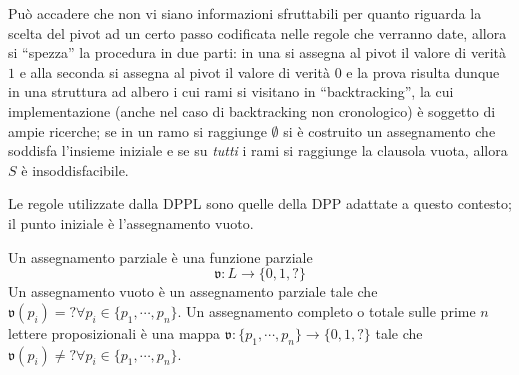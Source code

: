 Può accadere che non vi siano informazioni sfruttabili per quanto riguarda 
la scelta del pivot ad un certo passo codificata nelle regole che verranno 
date, allora si ``spezza'' la procedura in due parti: in una si assegna al pivot 
il valore di verità $1$ e alla seconda si assegna al pivot il valore di verità 
$0$ e la prova risulta dunque in una 
struttura ad albero i cui rami si visitano in ``backtracking'', la cui implementazione
(anche nel caso di backtracking non cronologico) è soggetto di ampie ricerche; 
se in un ramo si raggiunge $\emptyset$ si è costruito un assegnamento che soddisfa 
l'insieme iniziale e se su \textit{tutti} i rami si raggiunge la clausola 
vuota, allora $S$ è insoddisfacibile.

Le regole utilizzate dalla DPPL sono quelle della DPP adattate a questo contesto; 
il punto iniziale è l'assegnamento vuoto. 

\begin{defi}
        Un assegnamento parziale è una funzione parziale 
        $$
        \mathfrak{v}: L \rightarrow \{0,1,?\}
        $$
        Un assegnamento vuoto è un assegnamento parziale tale che 
        $\mathfrak{v}(p_i) = ? \forall p_i \in \{p_1, \cdots, p_n\}$.
        Un assegnamento completo o totale sulle prime $n$ lettere proposizionali 
        è una mappa $\mathfrak{v}: \{p_1, \cdots, p_n\} \rightarrow \{0,1,?\}$ 
        tale che $\mathfrak{v}(p_i) \neq ? \forall p_i \in \{p_1, \cdots, p_n\}$.
\end{defi}

